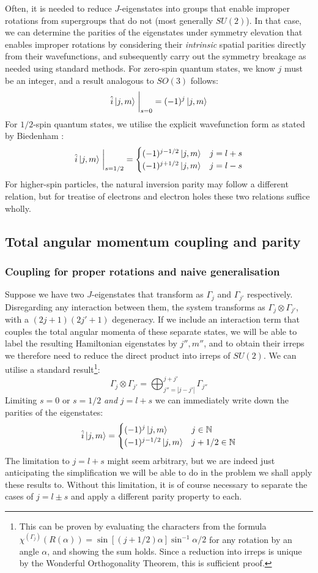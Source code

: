 \documentclass[12pt]{article}
\begin{document}
	Often, it is needed to reduce $J$-eigenstates into groups that enable improper rotations from supergroups that do not (most generally $SU(2)$). In that case, we can determine the parities of the eigenstates under symmetry elevation that enables improper rotations by considering their \textit{intrinsic} spatial parities directly from their wavefunctions, and subsequently carry out the symmetry breakage as needed using standard methods. For zero-spin quantum states, we know $j$ must be an integer, and a result analogous to $SO(3)$ follows:
	$$\hat{i}\ket{j,m}\eval_{s=0}=(-1)^j\ket{j,m}$$
	For $1/2$-spin quantum states, we utilise the explicit wavefunction form as stated by Biedenham \cite[p. 283]{spinor_spherical_harmonics}:
	$$\hat{i}\ket{j,m}\eval_{s=1/2}=
	\begin{cases}
	(-1)^{j-1/2}\ket{j,m} & j = l + s\\
	(-1)^{j+1/2}\ket{j,m} & j = l - s
	\end{cases}$$
	For higher-spin particles, the natural inversion parity may follow a different relation, but for treatise of electrons and electron holes these two relations suffice wholly.
	
	\subsection{Total angular momentum coupling and parity}
	
	\subsubsection{Coupling for proper rotations and naive generalisation}
	Suppose we have two $J$-eigenstates that transform as $\Gamma_{j}$ and $\Gamma_{j'}$ respectively. Disregarding any interaction between them, the system transforms as $\Gamma_{j}\otimes\Gamma_{j'}$, with a $(2j+1)(2j'+1)$ degeneracy. If we include an interaction term that couples the total angular momenta of these separate states, we will be able to label the resulting Hamiltonian eigenstates by $j'',m''$, and to obtain their irreps we therefore need to reduce the direct product into irreps of $SU(2)$. We can utilise a standard result\footnote{This can be proven by evaluating the characters from the formula $\chi^{\left(\Gamma_j\right)}(R(\alpha))=\sin{\left[(j+1/2)\alpha\right]}\sin^{-1}\alpha/2$ for any rotation by an angle $\alpha$, and showing the sum holds. Since a reduction into irreps is unique by the Wonderful Orthogonality Theorem, this is sufficient proof.}:
	$$\Gamma_j\otimes\Gamma_{j'}=\bigoplus_{j''=|j-j'|}^{j+j'}\Gamma_{j''}$$
	Limiting $s=0$ or $s=1/2$ \textit{and} $j=l+s$ we can immediately write down the parities of the eigenstates:
	$$\hat{i}\ket{j,m}=\begin{cases}
	(-1)^j\ket{j,m} & j\in\mathbb{N}\\
	(-1)^{j-1/2}\ket{j,m} & j+1/2\in\mathbb{N}
	\end{cases}$$
	The limitation to $j=l+s$ might seem arbitrary, but we are indeed just anticipating the simplification we will be able to do in the problem we shall apply these results to. Without this limitation, it is of course necessary to separate the cases of $j=l\pm s$ and apply a different parity property to each.
	
\end{document}
